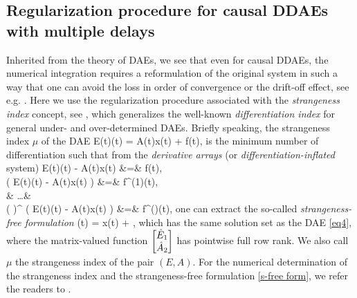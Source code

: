 \documentclass[final,reqno]{siamltex}
\begin{document}
\subsection{Regularization procedure for causal DDAEs with multiple delays}\label{Sec2.1}
Inherited from the theory of DAEs, we see that even for causal DDAEs, the numerical integration requires a reformulation of the original system in such a way that one can 
avoid the loss in order of convergence or the drift-off effect, see e.g. \cite{BreCP96,KunM06}. Here we use the regularization procedure 
associated with the \emph{strangeness index} concept, see \cite{KunM06}, which generalizes the well-known \emph{differentiation index} \cite{BreCP96} for general 
under- and over-determined DAEs. Briefly speaking, the strangeness index $\mu$ of the DAE 
%
\be\label{eq4}
 E(t)(t) = A(t)x(t) + f(t), 
\ee
%
is the minimum number of differentiation such that from the \emph{derivative arrays} (or \emph{differentiation-inflated} system)
%
\bens
 E(t)(t) - A(t)x(t)  &=& f(t), \\
 \ddt \left( E(t)(t) - A(t)x(t) \right) &=& f^{(1)}(t), \\
 & \dots & \\
 \left( \ddt \right)^{\mu} \left( E(t)(t) - A(t)x(t) \right) &=& f^{(\mu)}(t),
\eens
%
one can extract the so-called \emph{strangeness-free formulation}
%
\be\label{s-free form}
  (t) =  x(t) + ,
\ee
%
which has the same solution set as the DAE \eqref{eq4}, where the matrix-valued function $\begin{bmatrix} \hat{E}_1 \\ \hat{A}_2 \end{bmatrix}$ has pointwise full row rank.
We also call $\mu$ the strangeness index of the pair $(E,A)$. 
For the numerical determination of the strangeness index and the strangeness-free formulation \eqref{s-free form}, we refer the readers to 
\cite{KunMRW97,KunMS05}.
\end{document}
